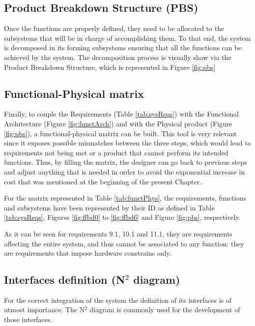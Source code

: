\subsection{Product Breakdown Structure (PBS)}

Once the functions are properly defined, they need to be allocated to the subsystems that will be in charge of accomplishing them.
To that end, the system is decomposed in its forming subsystems ensuring that all the functions can be achieved by the system.
The decomposition process is visually show via the Product Breakdown Structure, which is represented in Figure \ref{fig:pbs}




\subsection{Functional-Physical matrix}

Finally, to couple the Requirements (Table \ref{tab:sysReqs}) with the Functional Architecture (Figure \ref{fig:functArch}) and with the Physical product (Figure \ref{fig:pbs}), a functional-physical matrix can be built.
This tool is very relevant since it exposes possible mismatches between the three steps, which would lead to requirements not being met or a product that cannot perform its intended functions.
Thus, by filling the matrix, the designer can go back to previous steps and adjust anything that is needed in order to avoid the exponential increase in cost that was mentioned at the beginning of the present Chapter.

For the matrix represented in Table \ref{tab:functPhys}, the requirements, functions and subsystems have been represented by their ID as defined in Table \ref{tab:sysReqs}, Figures \ref{fig:ffbd0} to \ref{fig:ffbd6} and Figure \ref{fig:pbs}, respectively.



As it can be seen for requirements 9.1, 10.1 and 11.1, they are requirements affecting the entire system, and thus cannot be associated to any function: they are requirements that impose hardware constrains only.

\subsection{Interfaces definition (N$^2$ diagram)} \label{sec:interfaces}

For the correct integration of the system the definition of its interfaces is of utmost importance.
The N$^2$ diagram is commonly used for the development of those interfaces.

